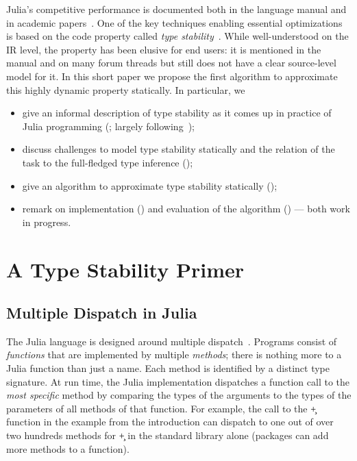 \documentclass[sigplan,review,anonymous]{acmart}
\begin{document}
Julia's competitive performance is documented both in the language manual and in
academic papers~\cite{oopsla18a}. One of the key techniques enabling
essential optimizations is based on the code property called \emph{type
stability}~\cite{Pelenitsyn21}. While well-understood on the IR level, the
property has been elusive for end users: it is mentioned in the manual and on
many forum threads but still does not have a clear source-level model for it.
In this short paper we propose the first algorithm to approximate this highly
dynamic property statically. In particular, we
\begin{itemize}

  \item give an informal description of type stability as it comes up in
  practice of Julia programming (; largely following~\cite{Pelenitsyn21});

  \item discuss challenges to model type stability statically and the relation
  of the task to the full-fledged type inference ();

  \item give an algorithm to approximate type stability statically ();

  \item remark on implementation () and
  evaluation of the algorithm () --- both work in progress.
\end{itemize}

\section{A Type Stability Primer}%
\label{sec:back}

\subsection{Multiple Dispatch in Julia}%

The Julia language is designed around multiple dispatch~\cite{BezansonEKS17}.
Programs consist of \emph{functions} that are implemented by multiple
\emph{methods}; there is nothing more to a Julia function than just a name. Each
method is identified by a distinct type signature. At run time, the Julia
implementation dispatches a function call to the \emph{most specific} method by
comparing the types of the arguments to the types of the parameters of all
methods of that function. For example, the call to the \c{+} function in the
example from the introduction can dispatch to one out of over two hundreds
methods for \c{+} in the standard library alone (packages can add more methods
to a function). %
\end{document}
